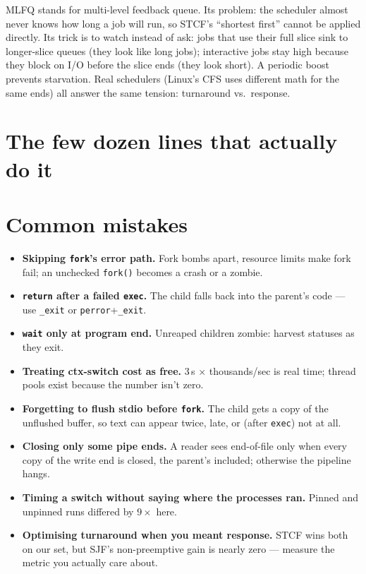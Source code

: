 

MLFQ stands for multi-level feedback queue. Its problem: the
scheduler almost never knows how long a job will run, so STCF's
``shortest first'' cannot be applied directly. Its trick is to watch
instead of ask:
jobs that use their full slice sink to longer-slice queues (they
look like long jobs); interactive jobs stay high because they block
on I/O before the slice ends (they look short). A
periodic boost prevents starvation. Real schedulers (Linux's
CFS uses different math for the same ends) all answer the same
tension: turnaround vs.\ response.

\section{The few dozen lines that actually do it}
\label{sec:xv6_12}



\section{Common mistakes}
\label{sec:mistakes12}
\begin{itemize}
\item \textbf{Skipping \texttt{fork}'s error path.} Fork bombs
      apart, resource limits make fork fail; an unchecked
      \texttt{fork()} becomes a crash or a zombie.
\item \textbf{\texttt{return} after a failed \texttt{exec}.} The
      child falls back into the parent's code --- use
      \texttt{\_exit} or \texttt{perror}+\texttt{\_exit}.
\item \textbf{\texttt{wait} only at program end.} Unreaped children
      zombie: harvest statuses as they exit.
\item \textbf{Treating ctx-switch cost as free.} 3\,\textmu s
      $\times$ thousands/sec is real time; thread pools exist
      because the number isn't zero.
\item \textbf{Forgetting to flush stdio before \texttt{fork}.} The
      child gets a copy of the unflushed buffer, so text can appear
      twice, late, or (after \texttt{exec}) not at all.
\item \textbf{Closing only some pipe ends.} A reader sees end-of-file
      only when every copy of the write end is closed, the parent's
      included; otherwise the pipeline hangs.
\item \textbf{Timing a switch without saying where the processes
      ran.} Pinned and unpinned runs differed by $9\times$ here.
\item \textbf{Optimising turnaround when you meant response.} STCF
      wins both on our set, but SJF's non-preemptive gain is nearly
      zero --- measure the metric you actually care about.
\end{itemize}

